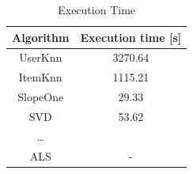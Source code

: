 \documentclass[letterpaper, 10 pt, conference]{ieeeconf}  %
\begin{document}
\begin{table}[]
\centering
\begin{tabular}{|c|c|}
\hline 
\rowcolor[HTML]{DAE8FC} 
Algorithm & Execution time [s]   \\ \hline \hline
UserKnn   & 3270.64  \\ \hline
ItemKnn   & 1115.21  \\ \hline
SlopeOne  & 29.33  \\ \hline
SVD       & 53.62  \\ \hline
\dots     &   \\ \hline
ALS       &  - \\ \hline

\end{tabular}
\caption{Execution Time}
\label{exctime-data}
\end{table}
\end{document}
